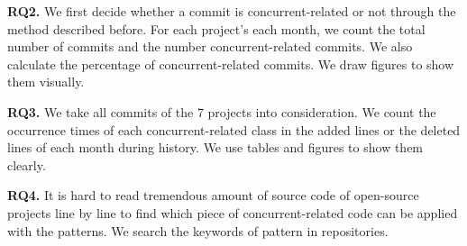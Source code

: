 \textbf{RQ2.} We first decide whether a commit is concurrent-related or not through the method described before. For each project's each month, we count the total number of commits and the number concurrent-related commits. We also calculate the percentage of concurrent-related commits. We draw figures to show them visually.

\textbf{RQ3.} We take all commits of the 7 projects into consideration. We count the occurrence times of each concurrent-related class in the added lines or the deleted lines of each month during history. We use tables and figures to show them clearly.

\textbf{RQ4.} It is hard to read tremendous amount of source code of open-source projects line by line to find which piece of concurrent-related code can be applied with the patterns. We search the keywords of pattern in repositories.



